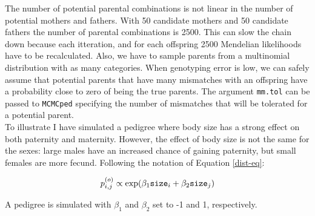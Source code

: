 \documentclass{article}
\begin{document}
The number of potential parental combinations is not linear in the number of potential mothers and fathers.  With 50 candidate mothers and 50 candidate fathers the number of parental combinations is 2500.  This can slow the chain down because each itteration, and for each offspring 2500 Mendelian likelihoods have to be recalculated.  Also, we have to sample parents from a multinomial distribution with as many categories.  When genotyping error is low, we can safely assume that potential parents that have many mismatches with an offspring have a probability close to zero of being the true parents.  The argument \texttt{mm.tol} can be passed to \texttt{MCMCped} specifying the number of mismatches that will be tolerated for a potential parent.\\

To illustrate I have simulated a pedigree where body size has a strong effect on both paternity and maternity.  However, the effect of body size is not the same for the sexes: large males have an increased chance of gaining paternity, but small females are more fecund. Following the notation of Equation \ref{dist-eq}:

\begin{equation}
p^{(o)}_{i,j} \propto \textrm{exp}(\beta_{1}\textrm{\texttt{size}}_{i} + \beta_{2}\textrm{\texttt{size}}_{j})
\end{equation}

A pedigree is simulated with $\beta_{1}$ and $\beta_{2}$ set to -1 and 1, respectively.
\end{document}
